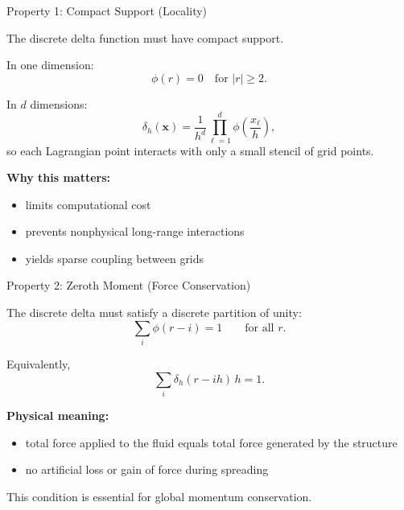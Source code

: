\documentclass{beamer}
\begin{document}
\begin{frame}{Property 1: Compact Support (Locality)}

The discrete delta function must have compact support.

\medskip

In one dimension:
\[
\phi(r) = 0 \quad \text{for } |r| \geq 2.
\]

\medskip

In $d$ dimensions:
\[
\delta_h(\mathbf{x})
=
\frac{1}{h^d}
\prod_{\ell=1}^{d}
\phi\!\left(\frac{x_\ell}{h}\right),
\]
so each Lagrangian point interacts with only a small stencil of grid points.

\medskip

\textbf{Why this matters:}
\begin{itemize}
    \item limits computational cost
    \item prevents nonphysical long-range interactions
    \item yields sparse coupling between grids
\end{itemize}

\end{frame}

\begin{frame}{Property 2: Zeroth Moment (Force Conservation)}

The discrete delta must satisfy a discrete partition of unity:
\[
\sum_{i}
\phi(r-i)
=
1
\qquad \text{for all } r.
\]

\medskip

Equivalently,
\[
\sum_i \delta_h(r-ih)\,h = 1.
\]

\medskip

\textbf{Physical meaning:}
\begin{itemize}
    \item total force applied to the fluid equals total force generated by the structure
    \item no artificial loss or gain of force during spreading
\end{itemize}

\medskip

This condition is essential for global momentum conservation.

\end{frame}
\end{document}
